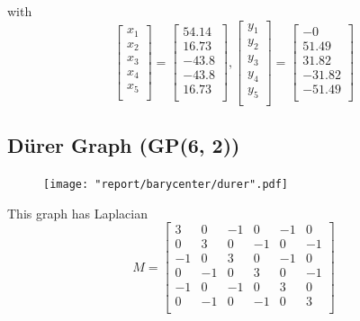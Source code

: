 \documentclass[11pt]{report}
\begin{document}
with
\[
    \begin{bmatrix}
    x_1 \\
    x_2 \\
    x_3 \\
    x_4 \\
    x_5 \\
    \end{bmatrix} 
    =
    \begin{bmatrix}
        54.14 \\
        16.73 \\
        -43.8 \\
        -43.8 \\
        16.73 \\
    \end{bmatrix},
        \begin{bmatrix}
    y_1 \\
    y_2 \\
    y_3 \\
    y_4 \\
    y_5 \\
    \end{bmatrix}  =
    \begin{bmatrix}
    -0 \\
    51.49 \\
    31.82 \\
    -31.82 \\
    -51.49 \\
    \end{bmatrix} 
\]

\pagebreak

\subsection{D{\"u}rer Graph (GP(6, 2))}
\begin{figure}[H]
    \centering
    \texttt{[image: "report/barycenter/durer".pdf]}
\end{figure}

This graph has Laplacian
\[
M = \begin{bmatrix}
3 & 0 & -1 & 0 & -1 & 0 \\
0 & 3 & 0 & -1 & 0 & -1 \\
-1 & 0 & 3 & 0 & -1 & 0 \\
0 & -1 & 0 & 3 & 0 & -1 \\
-1 & 0 & -1 & 0 & 3 & 0 \\
0 & -1 & 0 & -1 & 0 & 3 \\
\end{bmatrix}
\]
\end{document}
